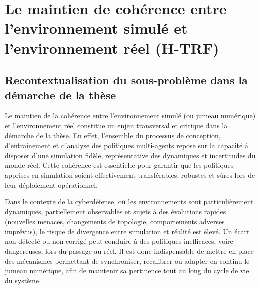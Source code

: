 

\section{Le maintien de cohérence entre l'environnement simulé et l'environnement réel (H-TRF)}

\subsection*{Recontextualisation du sous-problème dans la démarche de la thèse}

Le maintien de la cohérence entre l'environnement simulé (ou jumeau numérique) et l'environnement réel constitue un enjeu transversal et critique dans la démarche de la thèse. En effet, l'ensemble du processus de conception, d'entraînement et d'analyse des politiques multi-agents repose sur la capacité à disposer d'une simulation fidèle, représentative des dynamiques et incertitudes du monde réel. Cette cohérence est essentielle pour garantir que les politiques apprises en simulation soient effectivement transférables, robustes et sûres lors de leur déploiement opérationnel.

Dans le contexte de la cyberdéfense, où les environnements sont particulièrement dynamiques, partiellement observables et sujets à des évolutions rapides (nouvelles menaces, changements de topologie, comportements adverses imprévus), le risque de divergence entre simulation et réalité est élevé. Un écart non détecté ou non corrigé peut conduire à des politiques inefficaces, voire dangereuses, lors du passage au réel. Il est donc indispensable de mettre en place des mécanismes permettant de synchroniser, recalibrer ou adapter en continu le jumeau numérique, afin de maintenir sa pertinence tout au long du cycle de vie du système.

